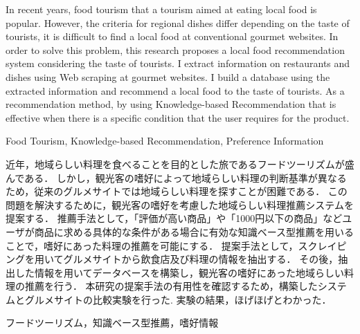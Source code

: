 \documentclass{funthesis}
\begin{document}
\maketitle       %

\begin{eabstract}
In recent years, food tourism that a tourism aimed at eating local food is popular.
However, the criteria for regional dishes differ depending on the taste of tourists, it is difficult to find a local food at conventional gourmet websites.
In order to solve this problem, this research proposes a local food recommendation system considering the taste of tourists.
I extract information on restaurants and dishes using Web scraping at gourmet websites.
I build a database using the extracted information and recommend a local food to the taste of tourists.
As a recommendation method, by using Knowledge-based Recommendation  that is effective when there is a specific condition that the user requires for the product.
\end{eabstract}

\begin{ekeyword}
Food Tourism, Knowledge-based Recommendation, Preference Information
\end{ekeyword}

\begin{jabstract}
近年，地域らしい料理を食べることを目的とした旅であるフードツーリズムが盛んである．
しかし，観光客の嗜好によって地域らしい料理の判断基準が異なるため，従来のグルメサイトでは地域らしい料理を探すことが困難である．
この問題を解決するために，観光客の嗜好を考慮した地域らしい料理推薦システムを提案する．
推薦手法として，「評価が高い商品」や「1000円以下の商品」などユーザが商品に求める具体的な条件がある場合に有効な知識ベース型推薦を用いることで，嗜好にあった料理の推薦を可能にする．
提案手法として，スクレイピングを用いてグルメサイトから飲食店及び料理の情報を抽出する．
その後，抽出した情報を用いてデータベースを構築し，観光客の嗜好にあった地域らしい料理の推薦を行う．
本研究の提案手法の有用性を確認するため，構築したシステムとグルメサイトの比較実験を行った.
実験の結果，ほげほげとわかった．
\end{jabstract}

\begin{jkeyword}
フードツーリズム，知識ベース型推薦，嗜好情報
\end{jkeyword}
\end{document}
